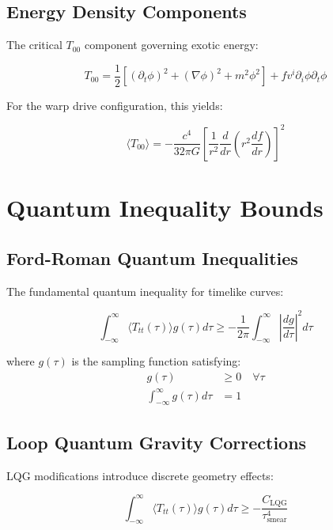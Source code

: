 \documentclass[12pt,a4paper]{article}
\begin{document}
\subsection{Energy Density Components}

The critical $T_{00}$ component governing exotic energy:

\begin{equation}
T_{00} = \frac{1}{2} \left[ (\partial_t \phi)^2 + (\nabla \phi)^2 + m^2 \phi^2 \right] + f v^i \partial_i \phi \partial_t \phi
\end{equation}

For the warp drive configuration, this yields:

\begin{equation}
\langle T_{00} \rangle = -\frac{c^4}{32\pi G} \left[ \frac{1}{r^2} \frac{d}{dr}\left(r^2 \frac{df}{dr}\right) \right]^2
\end{equation}

\section{Quantum Inequality Bounds}

\subsection{Ford-Roman Quantum Inequalities}

The fundamental quantum inequality for timelike curves:

\begin{equation}
\int_{-\infty}^{\infty} \langle T_{tt}(\tau) \rangle g(\tau) d\tau \geq -\frac{1}{2\pi} \int_{-\infty}^{\infty} \left|\frac{dg}{d\tau}\right|^2 d\tau
\end{equation}

where $g(\tau)$ is the sampling function satisfying:
\begin{align}
g(\tau) &\geq 0 \quad \forall \tau \\
\int_{-\infty}^{\infty} g(\tau) d\tau &= 1
\end{align}

\subsection{Loop Quantum Gravity Corrections}

LQG modifications introduce discrete geometry effects:

\begin{equation}
\int_{-\infty}^{\infty} \langle T_{tt}(\tau) \rangle g(\tau) d\tau \geq -\frac{C_{\text{LQG}}}{\tau_{\text{smear}}^4}
\end{equation}
\end{document}
